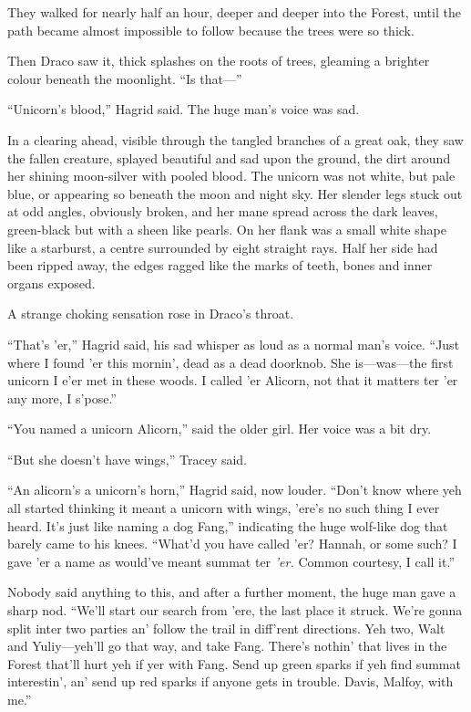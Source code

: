 They walked for nearly half an hour, deeper and deeper into the Forest, until the path became almost impossible to follow because the trees were so thick.

Then Draco saw it, thick splashes on the roots of trees, gleaming a brighter colour beneath the moonlight. “Is that—”

“Unicorn’s blood,” Hagrid said. The huge man’s voice was sad.

In a clearing ahead, visible through the tangled branches of a great oak, they saw the fallen creature, splayed beautiful and sad upon the ground, the dirt around her shining moon-silver with pooled blood. The unicorn was not white, but pale blue, or appearing so beneath the moon and night sky. Her slender legs stuck out at odd angles, obviously broken, and her mane spread across the dark leaves, green-black but with a sheen like pearls. On her flank was a small white shape like a starburst, a centre surrounded by eight straight rays. Half her side had been ripped away, the edges ragged like the marks of teeth, bones and inner organs exposed.

A strange choking sensation rose in Draco’s throat.

“That’s ’er,” Hagrid said, his sad whisper as loud as a normal man’s voice. “Just where I found ’er this mornin’, dead as a dead doorknob. She is—was—the first unicorn I e’er met in these woods. I called ’er Alicorn, not that it matters ter ’er any more, I s’pose.”

“You named a unicorn Alicorn,” said the older girl. Her voice was a bit dry.

“But she doesn’t have wings,” Tracey said.

“An alicorn’s a unicorn’s horn,” Hagrid said, now louder. “Don’t know where yeh all started thinking it meant a unicorn with wings, ’ere’s no such thing I ever heard. It’s just like naming a dog Fang,” indicating the huge wolf-like dog that barely came to his knees. “What’d you have called ’er? Hannah, or some such? I gave ’er a name as would’ve meant summat ter \emph{’er.} Common courtesy, I call it.”

Nobody said anything to this, and after a further moment, the huge man gave a sharp nod. “We’ll start our search from ’ere, the last place it struck. We’re gonna split inter two parties an’ follow the trail in diff’rent directions. Yeh two, Walt and Yuliy—yeh’ll go that way, and take Fang. There’s nothin’ that lives in the Forest that’ll hurt yeh if yer with Fang. Send up green sparks if yeh find summat interestin’, an’ send up red sparks if anyone gets in trouble. Davis, Malfoy, with me.”

